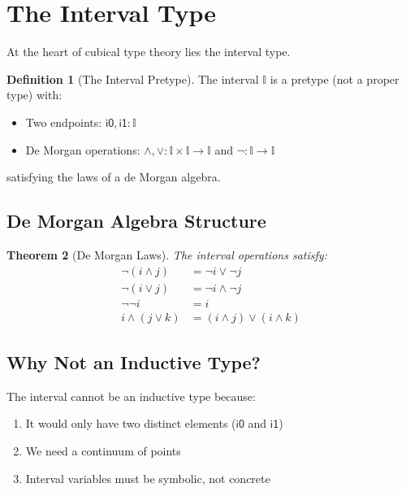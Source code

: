 \documentclass[12pt,openright,twoside]{book}
\theoremstyle{plain}
\newtheorem{theorem}{Theorem}[chapter]
\theoremstyle{definition}
\newtheorem{definition}[theorem]{Definition}
\theoremstyle{remark}
\newcommand{\I}{\mathbb{I}}
\newcommand{\izero}{\mathsf{i0}}
\newcommand{\ione}{\mathsf{i1}}
\begin{document}
\section{The Interval Type}
\label{sec:interval}

At the heart of cubical type theory lies the interval type.

\begin{definition}[The Interval Pretype]
The interval $\I$ is a pretype (not a proper type) with:
\begin{itemize}
\item Two endpoints: $\izero, \ione : \I$
\item De Morgan operations: $\land, \lor : \I \times \I \to \I$ and $\neg : \I \to \I$
\end{itemize}
satisfying the laws of a de Morgan algebra.
\end{definition}

\subsection{De Morgan Algebra Structure}

\begin{theorem}[De Morgan Laws]
The interval operations satisfy:
\begin{align}
\neg(i \land j) &= \neg i \lor \neg j \\
\neg(i \lor j) &= \neg i \land \neg j \\
\neg\neg i &= i \\
i \land (j \lor k) &= (i \land j) \lor (i \land k)
\end{align}
\end{theorem}

\subsection{Why Not an Inductive Type?}

The interval cannot be an inductive type because:
\begin{enumerate}
\item It would only have two distinct elements ($\izero$ and $\ione$)
\item We need a continuum of points
\item Interval variables must be symbolic, not concrete
\end{enumerate}


\backmatter




\printindex
\end{document}
